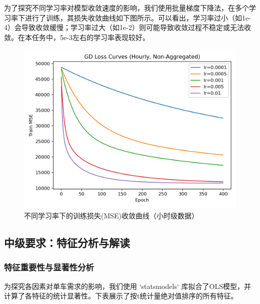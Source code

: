 \documentclass[UTF8,a4paper,10pt]{ctexart}
\begin{document}
为了探究不同学习率对模型收敛速度的影响，我们使用批量梯度下降法，在多个学习率下进行了训练，其损失收敛曲线如下图所示。可以看出，学习率过小（如1e-4）会导致收敛缓慢；学习率过大（如1e-2）则可能导致收敛过程不稳定或无法收敛。在本任务中，5e-3左右的学习率表现较好。
\begin{figure}[H]
    \centering
    \includegraphics[width=0.7\linewidth]{pic/gd_loss_curves_nonagg.png}
    \caption{不同学习率下的训练损失(MSE)收敛曲线（小时级数据）}
    \label{fig:loss_curve_nonagg}
\end{figure}

\subsection{中级要求：特征分析与解读}
\subsubsection{特征重要性与显著性分析}
为探究各因素对单车需求的影响，我们使用 `statsmodels` 库拟合了OLS模型，并计算了各特征的统计显著性。下表展示了按t统计量绝对值排序的所有特征。
\end{document}
